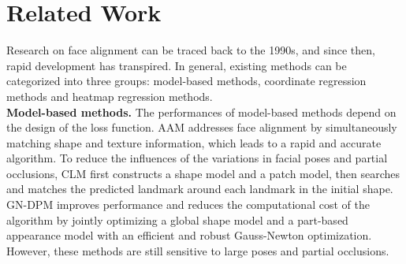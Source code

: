 \documentclass[journal]{IEEEtran}
\begin{document}
\section{Related Work}
Research on face alignment can be traced back to the 1990s, and since then, rapid development has transpired. In general, existing methods can be categorized into three groups: model-based methods, coordinate regression methods and heatmap regression methods.
\\\indent\textbf{Model-based methods.} The performances of model-based methods  \cite{cootes1995active,cootes2001active, Cristinacce2006FeatureDA, Tzimiropoulos2014GaussNewtonDP} depend on the design of the loss function. AAM \cite{cootes2001active} addresses face alignment by simultaneously matching shape and texture information, which leads to a rapid and accurate algorithm. To reduce the influences of the variations in facial poses and partial occlusions, CLM \cite{Cristinacce2006FeatureDA} first constructs a shape model and a patch model, then searches and matches the predicted landmark around each landmark in the initial shape. GN-DPM \cite{Tzimiropoulos2014GaussNewtonDP} improves performance and reduces the computational cost of the algorithm by jointly optimizing a global shape model and a part-based appearance model with an efficient and robust Gauss-Newton optimization. However, these methods are still sensitive to large poses and partial occlusions.
\end{document}
